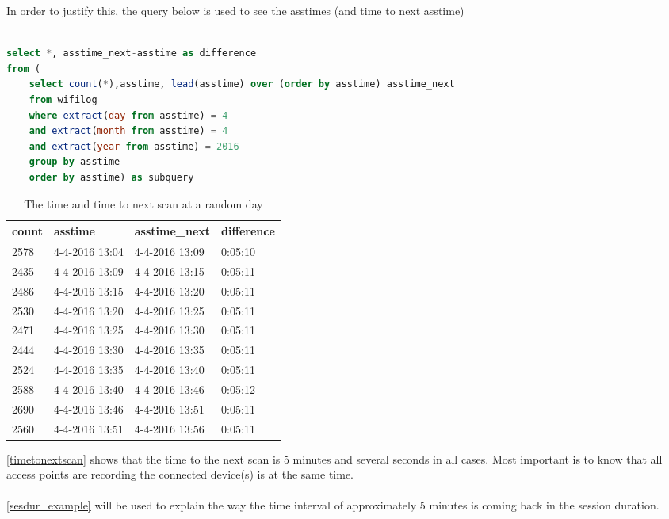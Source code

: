 In order to justify this, the query below is used to see the asstimes (and time to next asstime)\\\\
\begin{center}
\begin{lstlisting}[language=SQL]
select *, asstime_next-asstime as difference
from (
	select count(*),asstime, lead(asstime) over (order by asstime) asstime_next
	from wifilog
	where extract(day from asstime) = 4
	and extract(month from asstime) = 4
	and extract(year from asstime) = 2016
	group by asstime
	order by asstime) as subquery
\end{lstlisting}
\end{center}
\begin{table}[H]
	\centering
	\captionsetup{justification=centering}
	\caption{The time and time to next scan at a random day}
	\label{timetonextscan}
	\begin{tabular}{@{}llll@{}}
		\toprule
		count & asstime        & asstime\_next  & difference \\ \midrule
		2578  & 4-4-2016 13:04 & 4-4-2016 13:09 & 0:05:10    \\
		2435  & 4-4-2016 13:09 & 4-4-2016 13:15 & 0:05:11    \\
		2486  & 4-4-2016 13:15 & 4-4-2016 13:20 & 0:05:11    \\
		2530  & 4-4-2016 13:20 & 4-4-2016 13:25 & 0:05:11    \\
		2471  & 4-4-2016 13:25 & 4-4-2016 13:30 & 0:05:11    \\
		2444  & 4-4-2016 13:30 & 4-4-2016 13:35 & 0:05:11    \\
		2524  & 4-4-2016 13:35 & 4-4-2016 13:40 & 0:05:11    \\
		2588  & 4-4-2016 13:40 & 4-4-2016 13:46 & 0:05:12    \\
		2690  & 4-4-2016 13:46 & 4-4-2016 13:51 & 0:05:11    \\
		2560  & 4-4-2016 13:51 & 4-4-2016 13:56 & 0:05:11    \\ \bottomrule
	\end{tabular}
\end{table}
\autoref{timetonextscan} shows that the time to the next scan is 5 minutes and several seconds in all cases. Most important is to know that all access points are recording the connected device(s) is at the same time. \\\\                                                       
\autoref{sesdur_example} will be used to explain the way the time interval of approximately 5 minutes is coming back in the session duration.\\\\
